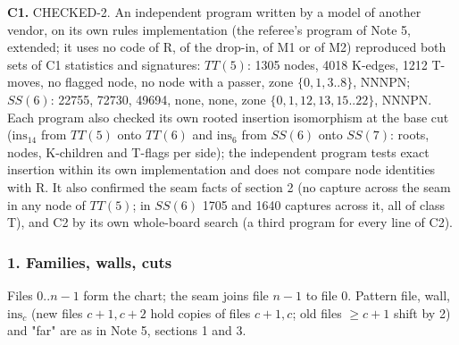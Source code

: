 \textbf{C1.} CHECKED-2. An independent program written by a model of another vendor, on its own rules implementation (the referee's program of Note 5, extended; it uses no code of R, of the drop-in, of M1 or of M2) reproduced both sets of C1 statistics and signatures: $TT(5)$: 1305 nodes, 4018 K-edges, 1212 T-moves, no flagged node, no node with a passer, zone $\{0,1,3..8\}$, NNNPN; $SS(6)$: 22755, 72730, 49694, none, none, zone $\{0,1,12,13,15..22\}$, NNNPN. Each program also checked its own rooted insertion isomorphism at the base cut ($\mathrm{ins}_{14}$ from $TT(5)$ onto $TT(6)$ and $\mathrm{ins}_6$ from $SS(6)$ onto $SS(7)$: roots, nodes, K-children and T-flags per side); the independent program tests exact insertion within its own implementation and does not compare node identities with R. It also confirmed the seam facts of section 2 (no capture across the seam in any node of $TT(5)$; in $SS(6)$ 1705 and 1640 captures across it, all of class T), and C2 by its own whole-board search (a third program for every line of C2).

\subsubsection*{1. Families, walls, cuts}
Files $0..n-1$ form the chart; the seam joins file $n-1$ to file $0$. Pattern file, wall, $\mathrm{ins}_c$ (new files $c+1,c+2$ hold copies of files $c+1,c$; old files $\ge c+1$ shift by 2) and "far" are as in Note 5, sections 1 and 3.

